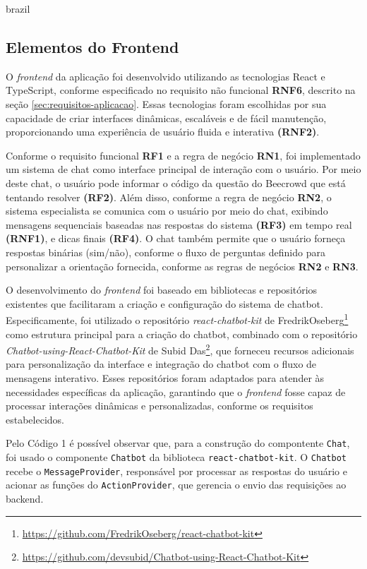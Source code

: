 \begin{otherlanguage*}{brazil}
\subsection{Elementos do Frontend}

O \textit{frontend} da aplicação foi desenvolvido utilizando as tecnologias React e TypeScript, conforme especificado no requisito não funcional \textbf{RNF6}, descrito na seção \ref{sec:requisitos-aplicacao}. Essas tecnologias foram escolhidas por sua capacidade de criar interfaces dinâmicas, escaláveis e de fácil manutenção, proporcionando uma experiência de usuário fluida e interativa \textbf{(RNF2)}.

Conforme o requisito funcional \textbf{RF1} e a regra de negócio \textbf{RN1}, foi implementado um sistema de chat como interface principal de interação com o usuário. Por meio deste chat, o usuário pode informar o código da questão do Beecrowd que está tentando resolver \textbf{(RF2)}. Além disso, conforme a regra de negócio \textbf{RN2}, o sistema especialista se comunica com o usuário por meio do chat, exibindo mensagens sequenciais baseadas nas respostas do sistema \textbf{(RF3)} em tempo real \textbf{(RNF1)}, e dicas finais \textbf{(RF4)}. O chat também permite que o usuário forneça respostas binárias (sim/não), conforme o fluxo de perguntas definido para personalizar a orientação fornecida, conforme as regras de negócios \textbf{RN2} e \textbf{RN3}.

O desenvolvimento do \textit{frontend} foi baseado em bibliotecas e repositórios existentes que facilitaram a criação e configuração do sistema de chatbot. Especificamente, foi utilizado o repositório \textit{react-chatbot-kit} de FredrikOseberg\footnote{\url{https://github.com/FredrikOseberg/react-chatbot-kit}} como estrutura principal para a criação do chatbot, combinado com o repositório \textit{Chatbot-using-React-Chatbot-Kit} de Subid Das\footnote{\url{https://github.com/devsubid/Chatbot-using-React-Chatbot-Kit}}, que forneceu recursos adicionais para personalização da interface e integração do chatbot com o fluxo de mensagens interativo. Esses repositórios foram adaptados para atender às necessidades específicas da aplicação, garantindo que o \textit{frontend} fosse capaz de processar interações dinâmicas e personalizadas, conforme os requisitos estabelecidos.

Pelo Código 1 é possível observar que, para a construção do compontente \texttt{Chat}, foi usado o componente \texttt{Chatbot} da biblioteca \texttt{react-chatbot-kit}. O \texttt{Chatbot} recebe o \texttt{MessageProvider}, responsável por processar as respostas do usuário e acionar as funções do \texttt{ActionProvider}, que gerencia o envio das requisições ao backend.


\end{otherlanguage*}
